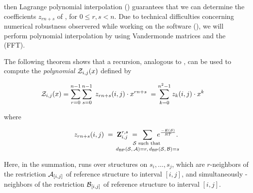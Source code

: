 then Lagrange polynomial interpolation
()
guarantees that we can determine the coefficients $z_{rn+s}$ of \fullZx,
for $0 \leq r,s < n$. Due to technical difficulties concerning numerical
robustness observered while working on the \fftbor software
(), we will perform polynomial interpolation
by using Vandermonde matrices and the \fft (FFT).

The following theorem shows that a
recursion, analogous to ,
can be used to compute
the {\em polynomial} ${\mathcal Z}_{i,j}(x)$ defined by

\begin{align}
\label{eq:ffttwo:emZij}
\emZ{i,j} &= \sum_{r=0}^{n-1} \sum_{s=0}^{n-1}\;
z_{rn+s}(i,j) \cdot x^{rn+s}\; =
\sum_{k=0}^{n^2-1} z_{k}(i,j) \cdot x^{k}
\end{align}

where

\begin{align}
z_{rn+s}(i,j) \;=\; \bfZ{r,s}{i,j}\;=
\enspace\sum_{\mathclap{\substack{
\str \text{ such that } \rule[-.5ex]{0pt}{0pt} \\
\dBP{\str}{\strA} = r,\,\dBP{\str}{\strB} = s
}}}\enspace
\boltzF{\str}.
\end{align}

Here, in the summation, \str runs over structures on $s_i,\dots,s_j$, which
are $r$-neighbors of the restriction $\mathcal A_{[i,j]}$ of reference structure
\strA to interval $[i,j]$, and simultaneously
\str-neighbors of the restriction $\mathcal B_{[i,j]}$ of reference structure
\strB to interval $[i,j]$.

